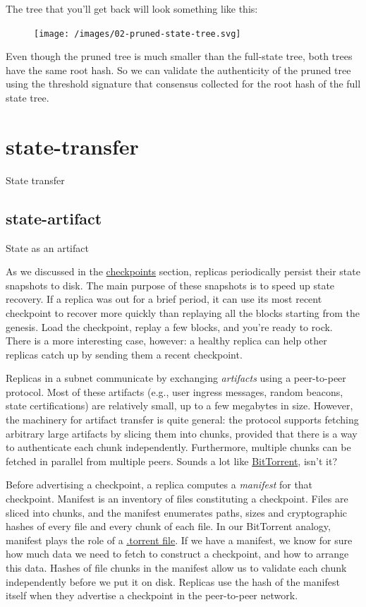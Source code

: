 \documentclass{article}
\begin{document}
The tree that you'll get back will look something like this:

\begin{figure}[grayscale-diagram]
\texttt{[image: /images/02-pruned-state-tree.svg]}
\end{figure}

Even though the pruned tree is much smaller than the full-state tree, both trees have the same root hash.
So we can validate the authenticity of the pruned tree using the threshold signature that consensus collected for the root hash of the full state tree.

\section{state-transfer}{State transfer}

\subsection{state-artifact}{State as an artifact}

As we discussed in the \href{#checkpoints}{checkpoints} section, replicas periodically persist their state snapshots to disk.
The main purpose of these snapshots is to speed up state recovery.
If a replica was out for a brief period, it can use its most recent checkpoint to recover more quickly than replaying all the blocks starting from the genesis.
Load the checkpoint, replay a few blocks, and you're ready to rock.
There is a more interesting case, however: a healthy replica can help other replicas catch up by sending them a recent checkpoint.

Replicas in a subnet communicate by exchanging \emph{artifacts} using a peer-to-peer protocol.
Most of these artifacts (e.g., user ingress messages, random beacons, state certifications) are relatively small, up to a few megabytes in size.
However, the machinery for artifact transfer is quite general: the protocol supports fetching arbitrary large artifacts by slicing them into chunks, provided that there is a way to authenticate each chunk independently.
Furthermore, multiple chunks can be fetched in parallel from multiple peers.
Sounds a lot like \href{https://en.wikipedia.org/wiki/BitTorrent}{BitTorrent}, isn't it?

Before advertising a checkpoint, a replica computes a \emph{manifest} for that checkpoint.
Manifest is an inventory of files constituting a checkpoint.
Files are sliced into chunks, and the manifest enumerates paths, sizes and cryptographic hashes of every file and every chunk of each file.
In our BitTorrent analogy, manifest plays the role of a \href{https://en.wikipedia.org/wiki/Torrent_file}{.torrent file}.
If we have a manifest, we know for sure how much data we need to fetch to construct a checkpoint, and how to arrange this data.
Hashes of file chunks in the manifest allow us to validate each chunk independently before we put it on disk.
Replicas use the hash of the manifest itself when they advertise a checkpoint in the peer-to-peer network.
\end{document}
